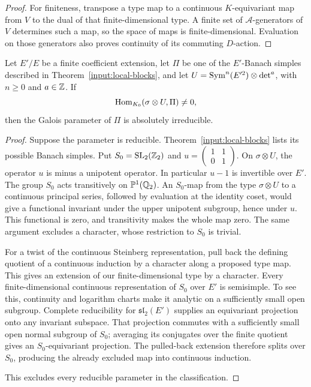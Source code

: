\begin{proof}
For finiteness, transpose a type map to a continuous $K$-equivariant
map from $V$ to the dual of that finite-dimensional type.  A finite
set of $\mathscr A$-generators of $V$ determines such a map, so the
space of maps is finite-dimensional.  Evaluation on those generators
also proves continuity of its commuting $D$-action.
\end{proof}

\begin{lemma}\label{lem:type-irreducible}
Let $E'/E$ be a finite coefficient extension, let $\Pi$ be one of the
$E'$-Banach simples described in Theorem~\ref{input:local-blocks}, and
let $U=\operatorname{Sym}^n(E'^2)\otimes\det^a$, with $n\geq0$ and $a\in\mathbb Z$.
If
\[
                  \operatorname{Hom}_{K_0}(\sigma\otimes U,\Pi)\ne0,
\]
then the Galois parameter of $\Pi$ is absolutely irreducible.
\end{lemma}
\begin{proof}
Suppose the parameter is reducible. Theorem~\ref{input:local-blocks}
lists its possible Banach simples. Put
$S_0=\operatorname{SL}_2(\mathbb Z_2)$ and
$u=\left(\begin{smallmatrix}1&1\\0&1\end{smallmatrix}\right)$.
On $\sigma\otimes U$, the operator $u$ is minus a unipotent
operator.  In particular $u-1$ is invertible over $E'$.
The group $S_0$ acts transitively on $\mathbb P^1(\mathbb Q_2)$.
An $S_0$-map from the type $\sigma\otimes U$ to a continuous principal series, followed
by evaluation at the identity coset, would give a functional invariant
under the upper unipotent subgroup, hence under $u$.  This functional
is zero, and transitivity makes the whole map zero.  The same argument
excludes a character, whose restriction to $S_0$ is trivial.

For a twist of the continuous Steinberg representation, pull back
the defining quotient of a continuous induction by a character along
a proposed type map.  This gives an extension of our finite-dimensional
type by a character.  Every finite-dimensional continuous
representation of $S_0$ over $E'$ is semisimple.  To see this,
continuity and logarithm charts make it analytic on a sufficiently
small open subgroup.  Complete reducibility for
$\mathfrak{sl}_2(E')$ supplies an equivariant projection onto any
invariant subspace.  That projection commutes with a sufficiently
small open normal subgroup of $S_0$; averaging its conjugates over
the finite quotient gives an $S_0$-equivariant projection.
The pulled-back extension therefore splits over $S_0$, producing
the already excluded map into continuous induction.

This excludes every reducible parameter in the classification.
\end{proof}

